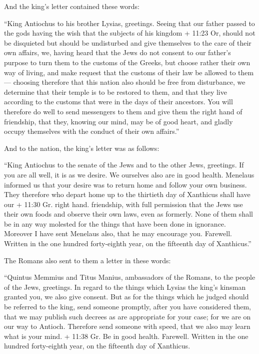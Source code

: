  And the king's letter contained these words:

``King Antiochus to his brother Lysias, greetings.  Seeing
that our father passed to the gods having the wish that the subjects of
his kingdom + 11:23 Or, should not be disquieted but should be
undisturbed and give themselves to the care of their own affairs,
 we, having heard that the Jews do not consent to our
father's purpose to turn them to the customs of the Greeks, but choose
rather their own way of living, and make request that the customs of
their law be allowed to them---  choosing therefore that
this nation also should be free from disturbance, we determine that
their temple is to be restored to them, and that they live according to
the customs that were in the days of their ancestors.  You
will therefore do well to send messengers to them and give them the
right hand of friendship, that they, knowing our mind, may be of good
heart, and gladly occupy themselves with the conduct of their own
affairs.''

 And to the nation, the king's letter was as follows:

``King Antiochus to the senate of the Jews and to the other Jews,
greetings.  If you are all well, it is as we desire. We
ourselves also are in good health.  Menelaus informed us
that your desire was to return home and follow your own business.
 They therefore who depart home up to the thirtieth day of
Xanthicus shall have our + 11:30 Gr. right hand. friendship, with full
permission  that the Jews use their own foods and observe
their own laws, even as formerly. None of them shall be in any way
molested for the things that have been done in ignorance. 
Moreover I have sent Menelaus also, that he may encourage you.
 Farewell. Written in the one hundred forty-eighth year, on
the fifteenth day of Xanthicus.''

 The Romans also sent to them a letter in these words:

``Quintus Memmius and Titus Manius, ambassadors of the Romans, to the
people of the Jews, greetings.  In regard to the things
which Lysias the king's kinsman granted you, we also give consent.
 But as for the things which he judged should be referred
to the king, send someone promptly, after you have considered them, that
we may publish such decrees as are appropriate for your case; for we are
on our way to Antioch.  Therefore send someone with speed,
that we also may learn what is your mind.  + 11:38 Gr. Be
in good health. Farewell. Written in the one hundred forty-eighth year,
on the fifteenth day of Xanthicus.

